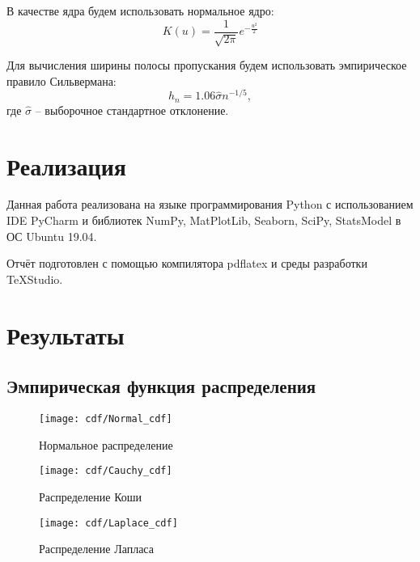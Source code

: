 В качестве ядра будем использовать нормальное ядро:
\begin{equation}
K(u)=\frac{1}{\sqrt{2\pi}}e^{-\frac{u^2}{2}}
\end{equation}

Для вычисления ширины полосы пропускания будем использовать эмпирическое правило Сильвермана:
\begin{equation}
h_n=1.06\hat{\sigma}n^{-1/5},
\end{equation}
где $\hat{\sigma}$ -- выборочное стандартное отклонение.
	
\section{Реализация}
Данная работа реализована на языке программирования Python с использованием IDE PyCharm и библиотек NumPy, MatPlotLib, Seaborn, SciPy, StatsModel в ОС Ubuntu 19.04.

Отчёт подготовлен с помощью компилятора pdflatex и среды разработки TeXStudio.

\section{Результаты}
\subsection{Эмпирическая функция распределения}

\begin{figure}[H]
	\begin{center}
		\texttt{[image: cdf/Normal\_cdf]}
		\caption{Нормальное распределение} 
		\label{pic:pic_name} 
	\end{center}
\end{figure}

\begin{figure}[H]
	\begin{center}
		\texttt{[image: cdf/Cauchy\_cdf]}
		\caption{Распределение Коши} 
		\label{pic:pic_name} 
	\end{center}
\end{figure}

\begin{figure}[H]
	\begin{center}
		\texttt{[image: cdf/Laplace\_cdf]}
		\caption{Распределение Лапласа} 
		\label{pic:pic_name} 
	\end{center}
\end{figure}

